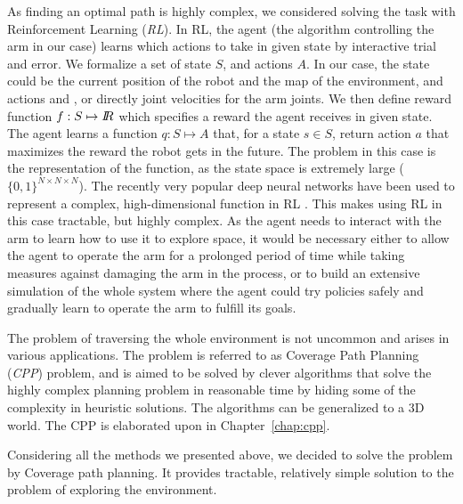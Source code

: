 \documentclass[buriama8_dp.tex]{subfiles}
\begin{document}
As finding an optimal path is highly complex, we considered solving the task with Reinforcement Learning (\emph{RL}). In RL, the agent (the algorithm controlling the arm in our case) learns which actions to take in given state by interactive trial and error. We formalize a set of state \(S\), and actions \(A\). In our case, the state could be the current position of the robot and the map of the environment, and actions  and , or directly joint velocities for the arm joints. We then define reward function \(f: S \mapsto I\!\!R\) which specifies a reward the agent receives in given state. The agent learns a function \(q: S \mapsto A\) that, for a state \(s \in S\), return action \(a\) that maximizes the reward the robot gets in the future. The problem in this case is the representation of the function, as the state space is extremely large (\(\{0,1\}^{N \times N \times N}\)). The recently very popular deep neural networks have been used to represent a complex, high-dimensional function in RL \cite{deeprl}. This makes using RL in this case tractable, but highly complex. As the agent needs to interact with the arm to learn how to use it to explore space, it would be necessary either to allow the agent to operate the arm for a prolonged period of time while taking measures against damaging the arm in the process, or to build an extensive simulation of the whole system where the agent could try policies safely and gradually learn to operate the arm to fulfill its goals.

The problem of traversing the whole environment is not uncommon and arises in various applications. The problem is referred to as Coverage Path Planning (\emph{CPP}) problem, and is aimed to be solved by clever algorithms that solve the highly complex planning problem in reasonable time by hiding some of the complexity in heuristic solutions. The algorithms can be generalized to a 3D world. The CPP is elaborated upon in Chapter~\ref{chap:cpp}.

Considering all the methods we presented above, we decided to solve the problem by Coverage path planning. It provides tractable, relatively simple solution to the problem of exploring the environment.
\end{document}
